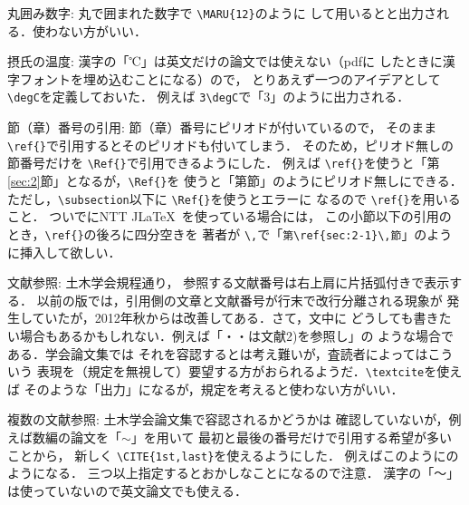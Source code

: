\documentclass[onecolumn]{jsce}  %
\begin{document}
\begin{Description}
%
\item[丸囲み数字:] 丸で囲まれた数字で \verb+\MARU{12}+のように
して用いるとと出力される．使わない方がいい．
%
\item[摂氏の温度:] 漢字の「℃」は英文だけの論文では使えない（pdfに
したときに漢字フォントを埋め込むことになる）ので，
とりあえず一つのアイデアとして \verb+\degC+を定義しておいた．
例えば \verb+3\degC+で「3\degC」のように出力される．
%
\item[節（章）番号の引用:] 節（章）番号にピリオドが付いているので，
そのまま \verb+\ref{}+で引用するとそのピリオドも付いてしまう．
そのため，ピリオド無しの節番号だけを \verb+\Ref{}+で引用できるようにした．
例えば \verb+\ref{}+を使うと「第\ref{sec:2}節」となるが，\verb+\Ref{}+を
使うと「第節」のようにピリオド無しにできる．
ただし，\verb+\subsection+以下に \verb+\Ref{}+を使うとエラーに
なるので \verb+\ref{}+を用いること．
ついでにNTT J\LaTeX\ を使っている場合には，
この小節以下の引用のとき，\verb+\ref{}+の後ろに四分空きを
著者が \verb+\,+で「\verb+第\ref{sec:2-1}\,節+」のように挿入して欲しい．
%
%
\item[文献参照:] 土木学会規程通り，
参照する文献番号は右上肩に片括弧付きで表示する．
以前の版では，引用側の文章と文献番号が行末で改行分離される現象が
発生していたが，2012年秋からは改善してある．さて，文中に
どうしても書きたい場合もあるかもしれない．例えば「・・は文献2)を参照し」の
ような場合である．学会論文集では
それを容認するとは考え難いが，査読者によってはこういう
表現を（規定を無視して）要望する方がおられるようだ．\verb+\textcite+を使えば
そのような「出力\textcite{1}」になるが，規定を考えると使わない方がいい．
%
\item[複数の文献参照:] 土木学会論文集で容認されるかどうかは
確認していないが，例えば数編の論文を「$\sim$」を用いて
最初と最後の番号だけで引用する希望が多いことから，
新しく \verb+\CITE{1st,last}+を使えるようにした．
例えばこのようにのようになる．
三つ以上指定するとおかしなことになるので注意．
漢字の「〜」は使っていないので英文論文でも使える．
\end{Description}
\end{document}

